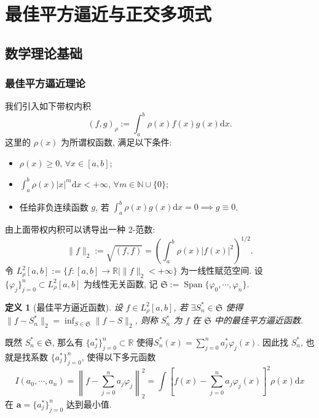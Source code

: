 \documentclass[UTF8, a4paper, 11pt]{ctexart}
\newtheorem{definition}{定义}[section]
\begin{document}
\section{最佳平方逼近与正交多项式}
\subsection{数学理论基础}
\subsubsection{最佳平方逼近理论}
我们引入如下带权内积
\[ (f, g)_{\rho} := \int_a^b \rho(x) f(x) g(x) \mathrm{d} x. \]
这里的 $ \rho(x) $ 为所谓权函数, 满足以下条件:
\begin{itemize}
    \item[1.] $ \rho(x) \geq 0, \, \forall x \in [a, b]; $
    \item[2.] $ \int_a^b \rho(x) |x|^m \mathrm{d} x < +\infty, \, \forall m \in \mathbb{N} \cup \{0\}; $
    \item[3.] 任给非负连续函数 $ g $, 若 $ \int_a^b \rho(x) g(x) \mathrm{d} x = 0 \implies g \equiv 0 $.
\end{itemize}
由上面带权内积可以诱导出一种 2-范数:
\[ \| f \|_2 := \sqrt{(f, f)} = \left( \int_a^b \rho(x) |f(x)|^2 \right)^{1/2}. \]
令 $ L_{\rho}^2[a, b] := \{ f : [a, b] \rightarrow \mathbb{R} \mid \| f \|_2 < +\infty \} $ 为一线性赋范空间.
设 $ \{\varphi_j\}_{j=0}^n \subset L_{\rho}^2[a, b] $ 为线性无关函数, 记 $ \mathfrak{S} := \operatorname{Span}\{\varphi_0, \cdots, \varphi_n\} $.
\begin{definition}[最佳平方逼近函数]
    设 $ f \in L_{\rho}^2[a, b] $, 若 $ \exists S_n^* \in \mathfrak{S} $ 使得$ \| f - S_n^* \|_2 = \inf_{S \in \mathfrak{S}} \| f - S \|_2 $, 则称 $ S_n^* $ 为 $ f $ 在 $ \mathfrak{S} $ 中的最佳平方逼近函数.
\end{definition}
既然 $ S_n^* \in \mathfrak{S} $, 那么有 $ \{a_j^*\}_{j=0}^n \subset \mathbb{R} $ 使得$ S_n^*(x) = \sum_{j=0}^n a_j^* \varphi_j(x) $. 因此找 $ S_n^* $, 也就是找系数 $ \{a_j^*\}_{j=0}^n $, 使得以下多元函数
\[ I(a_0, \cdots, a_n) = \left\| f - \sum_{j=0}^n a_j \varphi_j \right\|_2^2 = \int \left[ f(x) - \sum_{j=0}^n a_j \varphi_j(x) \right]^2 \rho(x) \mathrm{d} x \]
在 $ \bm{a} = \{a_j^*\}_{j=0}^n $ 达到最小值.
\end{document}
